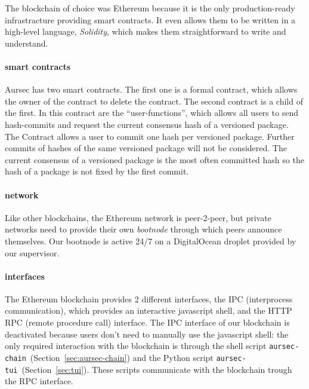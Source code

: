 The blockchain of choice was Ethereum because it is the only production-ready infrastracture providing smart contracts. It even allows them to be written in a high-level language, \emph{Solidity}, which makes them straightforward to write and understand.

\paragraph*{smart contracts}
Aursec has two smart contracts. The first one is a formal contract, which allows the owner of the contract to delete the contract. The second contract is a child of the first. In this contract are the ``user-functions'', which allows all users to send hash-commits and request the current consensus hash of a versioned package. The Contract allows a user to commit one hash per versioned package. Further commits of hashes of the same versioned package will not be considered. The current consensus of a versioned package is the most often committed hash so the hash of a package is not fixed by the first commit.

\paragraph*{network}
Like other blockchains, the Ethereum network is peer-2-peer, but private networks need to provide their own \emph{bootnode} through which peers announce themselves. Our bootnode is active 24/7 on a DigitalOcean droplet provided by our supervisor.

\paragraph*{interfaces}
The Ethereum blockchain provides 2 different interfaces, the IPC (interprocess communication), which provides an interactive javascript shell, and the HTTP RPC (remote procedure call) interface. The IPC interface of our blockchain is deactivated because users don't need to manually use the javascript shell: the only required interaction with the blockchain is through the shell script \texttt{aursec-chain}~(Section~\ref{sec:aursec-chain}) and the Python script \texttt{aursec-tui}~(Section~\ref{sec:tui}). These scripts communicate with the blockchain trough the RPC interface.
